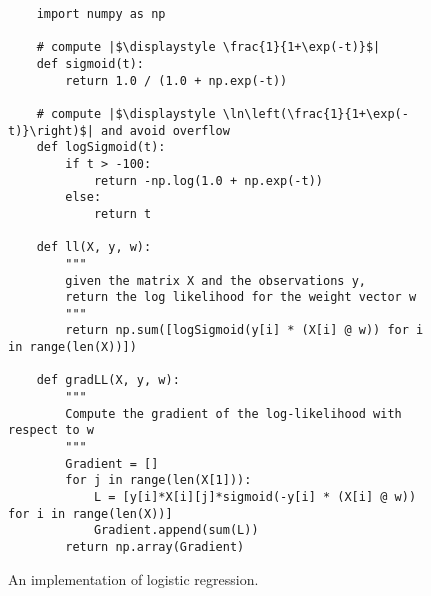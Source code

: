 \begin{figure}[!ht]
\centering

\begin{verbatim}
    import numpy as np
    
    # compute |$\displaystyle \frac{1}{1+\exp(-t)}$|
    def sigmoid(t):
        return 1.0 / (1.0 + np.exp(-t))
    
    # compute |$\displaystyle \ln\left(\frac{1}{1+\exp(-t)}\right)$| and avoid overflow
    def logSigmoid(t):
        if t > -100:
            return -np.log(1.0 + np.exp(-t))
        else:
            return t
    
    def ll(X, y, w):
        """
        given the matrix X and the observations y,
        return the log likelihood for the weight vector w
        """
        return np.sum([logSigmoid(y[i] * (X[i] @ w)) for i in range(len(X))])
    
    def gradLL(X, y, w):
        """
        Compute the gradient of the log-likelihood with respect to w 
        """
        Gradient = []
        for j in range(len(X[1])):
            L = [y[i]*X[i][j]*sigmoid(-y[i] * (X[i] @ w)) for i in range(len(X))]
            Gradient.append(sum(L))
        return np.array(Gradient)
\end{verbatim}

\caption{An implementation of logistic regression.}
\label{fig:logistic_regression.py}
\end{figure}
\FloatBarrier


